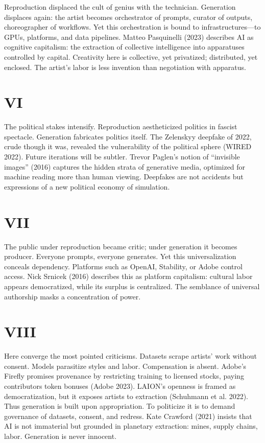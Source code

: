 \documentclass[12pt]{article}
\begin{document}
Reproduction displaced the cult of genius with the technician. Generation displaces again: the artist becomes orchestrator of prompts, curator of outputs, choreographer of workflows. Yet this orchestration is bound to infrastructures---to GPUs, platforms, and data pipelines. Matteo Pasquinelli (2023) describes AI as cognitive capitalism: the extraction of collective intelligence into apparatuses controlled by capital. Creativity here is collective, yet privatized; distributed, yet enclosed. The artist’s labor is less invention than negotiation with apparatus.

\section*{VI}

The political stakes intensify. Reproduction aestheticized politics in fascist spectacle. Generation fabricates politics itself. The Zelenskyy deepfake of 2022, crude though it was, revealed the vulnerability of the political sphere (WIRED 2022). Future iterations will be subtler. Trevor Paglen’s notion of “invisible images” (2016) captures the hidden strata of generative media, optimized for machine reading more than human viewing. Deepfakes are not accidents but expressions of a new political economy of simulation.

\section*{VII}

The public under reproduction became critic; under generation it becomes producer. Everyone prompts, everyone generates. Yet this universalization conceals dependency. Platforms such as OpenAI, Stability, or Adobe control access. Nick Srnicek (2016) describes this as platform capitalism: cultural labor appears democratized, while its surplus is centralized. The semblance of universal authorship masks a concentration of power.

\section*{VIII}

Here converge the most pointed criticisms. Datasets scrape artists’ work without consent. Models parasitize styles and labor. Compensation is absent. Adobe’s Firefly promises provenance by restricting training to licensed stocks, paying contributors token bonuses (Adobe 2023). LAION’s openness is framed as democratization, but it exposes artists to extraction (Schuhmann et al. 2022). Thus generation is built upon appropriation. To politicize it is to demand governance of datasets, consent, and redress. Kate Crawford (2021) insists that AI is not immaterial but grounded in planetary extraction: mines, supply chains, labor. Generation is never innocent.
\end{document}
